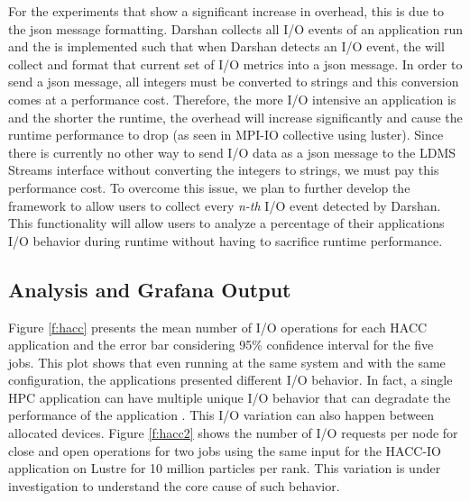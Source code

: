 For the experiments that show a significant increase in overhead, this is due to the json message formatting. Darshan collects all I/O events of an application run and the \connector{} is implemented such that when Darshan detects an I/O event, the \connector{} will collect and format that current set of I/O metrics into a json message. In order to send a json message, all integers must be converted to strings and this conversion comes at a performance cost. Therefore, the more I/O intensive an application is and the shorter the runtime, the overhead will increase significantly and cause the runtime performance to drop (as seen in MPI-IO collective using luster). Since there is currently no other way to send I/O data as a json message to the LDMS Streams interface without converting the integers to strings, we must pay this performance cost. To overcome this issue, we plan to further develop the \Darshan{} framework to allow users to collect every \emph{n-th} I/O event detected by Darshan. This functionality will allow users to analyze a percentage of their applications I/O behavior during runtime without having to sacrifice runtime performance.     


\subsection{Analysis and Grafana Output}
Figure \ref{f:hacc} presents the mean number of I/O operations for
each HACC application and the error bar considering 95\% confidence
interval for the five jobs. This plot shows that even running at the
same system and with the same configuration, the applications
presented different I/O behavior. In fact, a single HPC application
can have multiple unique I/O behavior that can degradate the
performance of the application \cite{costa2021}. This I/O variation
can also happen between allocated devices. Figure \ref{f:hacc2} shows the number of I/O requests per node for close and open operations for two jobs using the same input for the HACC-IO application on Lustre for 10 million particles per rank. This variation is under investigation to understand the core cause of such behavior.

